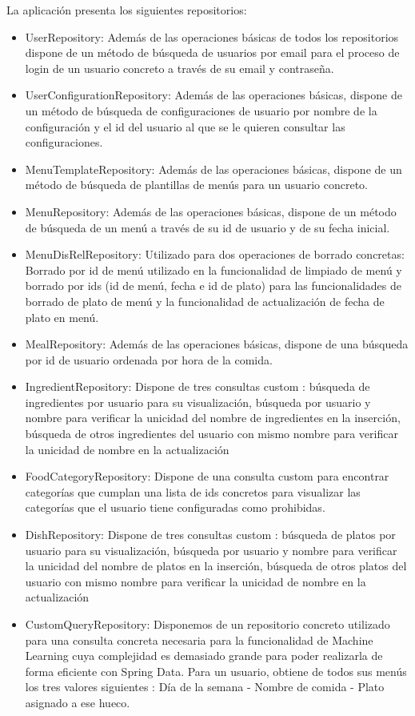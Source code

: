 \documentclass[12pt, a4paper, twoside]{book}
\begin{document}
	La aplicación presenta los siguientes repositorios:
	
	\begin{itemize}
		\item UserRepository: Además de las operaciones básicas de todos los repositorios dispone de un método de búsqueda de usuarios por email para el proceso de login de un usuario concreto a través de su email y contraseña.
		\item UserConfigurationRepository: Además de las operaciones básicas, dispone de un método de búsqueda de configuraciones de usuario por nombre de la configuración y el id del usuario al que se le quieren consultar las configuraciones.
		\item MenuTemplateRepository: Además de las operaciones básicas, dispone de un método de búsqueda de plantillas de menús para un usuario concreto.
		\item MenuRepository: Además de las operaciones básicas, dispone de un método de búsqueda de un menú a través de su id de usuario y de su fecha inicial.
		\item MenuDisRelRepository: Utilizado para dos operaciones de borrado concretas: Borrado por id de menú utilizado en la funcionalidad de limpiado de menú y borrado por ids (id de menú, fecha e id de plato) para las funcionalidades de borrado de plato de menú y la funcionalidad de actualización de fecha de plato en menú.
		\item MealRepository: Además de las operaciones básicas, dispone de una búsqueda por id de usuario ordenada por hora de la comida.
		\item IngredientRepository: Dispone de tres consultas custom : búsqueda de ingredientes por usuario para su visualización, búsqueda por usuario y nombre para verificar la unicidad del nombre de ingredientes en la inserción, búsqueda de otros ingredientes del usuario con mismo nombre para verificar la unicidad de nombre en la actualización
		\item FoodCategoryRepository: Dispone de una consulta custom para encontrar categorías que cumplan una lista de ids concretos para visualizar las categorías que el usuario tiene configuradas como prohibidas.
		\item DishRepository: Dispone de tres consultas custom : búsqueda de platos por usuario para su visualización, búsqueda por usuario y nombre para verificar la unicidad del nombre de platos en la inserción, búsqueda de otros platos del usuario con mismo nombre para verificar la unicidad de nombre en la actualización
		\item CustomQueryRepository: Disponemos de un repositorio concreto utilizado para una consulta concreta necesaria para la funcionalidad de Machine Learning cuya complejidad es demasiado grande para poder realizarla de forma eficiente con Spring Data. Para un usuario, obtiene de todos sus menús los tres valores siguientes : Día de la semana - Nombre de comida - Plato asignado a ese hueco. 	
	\end{itemize}
	
\end{document}
